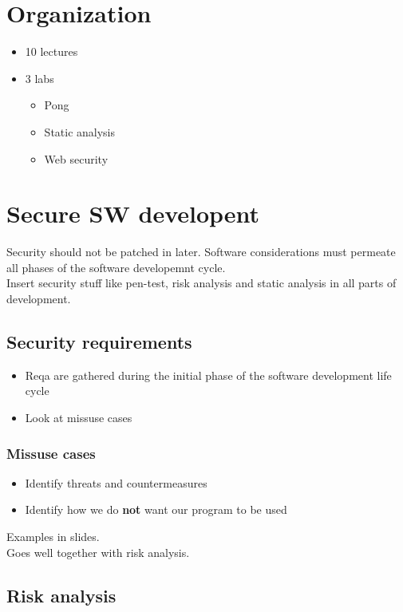\documentclass[course, english]{Notes}
\begin{document}
\section{Organization}
\begin{itemize}
	\item 10 lectures
	\item 3 labs
		\begin{itemize}
			\item Pong
			\item Static analysis
			\item Web security
		\end{itemize}
\end{itemize}


\section{Secure SW developent}
Security should not be patched in later. Software considerations must permeate all phases of the software developemnt cycle.
\\ Insert security stuff like pen-test, risk analysis and static analysis in all parts of development.
\subsection{Security requirements}
\begin{itemize}
	\item Reqa are gathered during the initial phase of the software development life cycle
	\item Look at missuse cases
\end{itemize}
\subsubsection{Missuse cases}
\begin{itemize}
	\item Identify threats and countermeasures
	\item Identify how we do \textbf{not} want our program to be used
\end{itemize}
Examples in slides.\\
Goes well together with risk analysis.

\subsection{Risk analysis}
\end{document}
